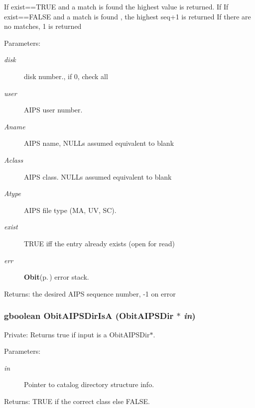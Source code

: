 If exist==TRUE and a match is found the highest value is returned. If If exist==FALSE and a match is found , the highest seq+1 is returned If there are no matches, 1 is returned \begin{Desc}
\item[Parameters:]
\begin{description}
\item[{\em disk}]disk number., if 0, check all \item[{\em user}]AIPS user number. \item[{\em Aname}]AIPS name, NULLs assumed equivalent to blank \item[{\em Aclass}]AIPS class. NULLs assumed equivalent to blank \item[{\em Atype}]AIPS file type (MA, UV, SC). \item[{\em exist}]TRUE iff the entry already exists (open for read) \item[{\em err}]{\bf Obit}{\rm (p.\,\pageref{structObit})} error stack. \end{description}
\end{Desc}
\begin{Desc}
\item[Returns:]the desired AIPS sequence number, -1 on error \end{Desc}
\subsubsection{\setlength{\rightskip}{0pt plus 5cm}gboolean Obit\-AIPSDir\-Is\-A ({\bf Obit\-AIPSDir} $\ast$ {\em in})}\label{ObitAIPSDir_8c_a13}


Private: Returns true if input is a Obit\-AIPSDir$\ast$. 

\begin{Desc}
\item[Parameters:]
\begin{description}
\item[{\em in}]Pointer to catalog directory structure info. \end{description}
\end{Desc}
\begin{Desc}
\item[Returns:]TRUE if the correct class else FALSE. \end{Desc}
